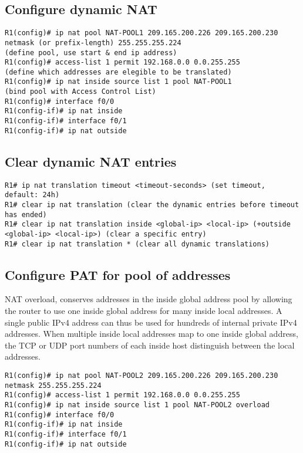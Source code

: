 \documentclass[10pt, a4paper]{article}
\begin{document}
\subsection{Configure dynamic NAT}
\begin{lstlisting}
R1(config)# ip nat pool NAT-POOL1 209.165.200.226 209.165.200.230 netmask (or prefix-length) 255.255.255.224
(define pool, use start & end ip address)
R1(config)# access-list 1 permit 192.168.0.0 0.0.255.255
(define which addresses are elegible to be translated)
R1(config)# ip nat inside source list 1 pool NAT-POOL1
(bind pool with Access Control List)
R1(config)# interface f0/0
R1(config-if)# ip nat inside
R1(config-if)# interface f0/1
R1(config-if)# ip nat outside
\end{lstlisting}

\subsection{Clear dynamic NAT entries}
\begin{lstlisting}
R1# ip nat translation timeout <timeout-seconds> (set timeout, default: 24h)
R1# clear ip nat translation (clear the dynamic entries before timeout has ended)
R1# clear ip nat translation inside <global-ip> <local-ip> (+outside <global-ip> <local-ip>) (clear a specific entry)
R1# clear ip nat translation * (clear all dynamic translations)
\end{lstlisting}

\subsection{Configure PAT for pool of addresses}
NAT overload, conserves addresses in the inside global address pool by allowing the router to use one inside global address for many inside local addresses. A single public IPv4 address can thus be used for hundreds of internal private IPv4 addresses. When multiple inside local addresses map to one inside global address, the TCP or UDP port numbers of each inside host distinguish between the local addresses.\\
\begin{lstlisting}
R1(config)# ip nat pool NAT-POOL2 209.165.200.226 209.165.200.230 netmask 255.255.255.224
R1(config)# access-list 1 permit 192.168.0.0 0.0.255.255
R1(config)# ip nat inside source list 1 pool NAT-POOL2 overload
R1(config)# interface f0/0
R1(config-if)# ip nat inside
R1(config-if)# interface f0/1
R1(config-if)# ip nat outside
\end{lstlisting}
\end{document}

